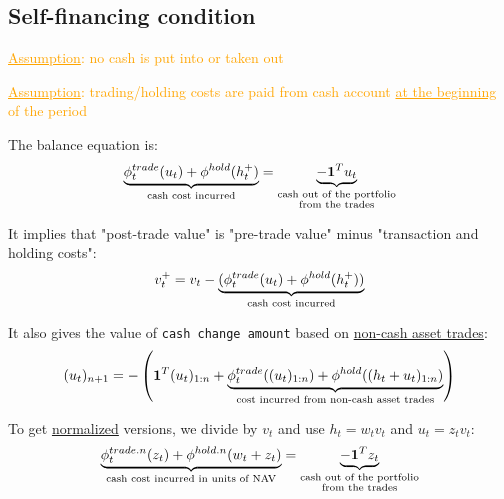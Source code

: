 \subsection{Self-financing condition}

\textcolor{orange}{\underline{Assumption}: no cash is put into or taken out}

\textcolor{orange}{\underline{Assumption}: trading/holding costs are paid from cash account \underline{at the beginning} of the period}

The balance equation is:
\begin{align}
	 \underbrace{\phi^{trade}_t(u_t) + \phi^{hold}(h_t^+)}_{\text{cash cost incurred}} = \underbrace{-\textbf{1}^T u_t}_{\substack{\text{cash out of the portfolio}\\\text{from the trades}}}
\end{align}

It implies that "post-trade value" is "pre-trade value" minus "transaction and holding costs":
\begin{align}
	v_t^+ = v_t - \underbrace{(\phi^{trade}_t(u_t) + \phi^{hold}(h_t^+))}_{\text{cash cost incurred}}
\end{align}

It also gives the value of \texttt{cash change amount} based on \underline{non-cash asset trades}:
\begin{align}
	(u_t)_{n+1} = - \left( \textbf{1}^T (u_t)_{1:n} + \underbrace{\phi^{trade}_t((u_t)_{1:n}) + \phi^{hold}((h_t+u_t)_{1:n})}_{\text{cost incurred from non-cash asset trades}}\right) 
\end{align}

To get \underline{normalized} versions, we divide by $v_t$ and use $h_t = w_t v_t$ and $u_t = z_t v_t$:
\begin{align}
	\underbrace{\phi^{trade.n}_t(z_t) + \phi^{hold.n}(w_t+z_t)}_{\text{cash cost incurred in units of NAV}} = \underbrace{-\textbf{1}^T z_t}_{\substack{\text{cash out of the portfolio}\\\text{from the trades}}}
\end{align}

